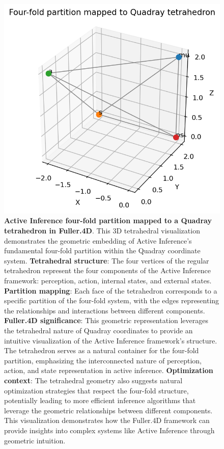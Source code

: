 \documentclass[
  10pt,
]{article}
\begin{document}
\begin{figure}
\centering
\includegraphics{../output/figures/partition_tetrahedron.png}
\caption{\textbf{Active Inference four-fold partition mapped to a
Quadray tetrahedron in Fuller.4D}. This 3D tetrahedral visualization
demonstrates the geometric embedding of Active Inference's fundamental
four-fold partition within the Quadray coordinate system.
\textbf{Tetrahedral structure}: The four vertices of the regular
tetrahedron represent the four components of the Active Inference
framework: perception, action, internal states, and external states.
\textbf{Partition mapping}: Each face of the tetrahedron corresponds to
a specific partition of the four-fold system, with the edges
representing the relationships and interactions between different
components. \textbf{Fuller.4D significance}: This geometric
representation leverages the tetrahedral nature of Quadray coordinates
to provide an intuitive visualization of the Active Inference
framework's structure. The tetrahedron serves as a natural container for
the four-fold partition, emphasizing the interconnected nature of
perception, action, and state representation in active inference.
\textbf{Optimization context}: The tetrahedral geometry also suggests
natural optimization strategies that respect the four-fold structure,
potentially leading to more efficient inference algorithms that leverage
the geometric relationships between different components. This
visualization demonstrates how the Fuller.4D framework can provide
insights into complex systems like Active Inference through geometric
intuition.}
\end{figure}
\end{document}
